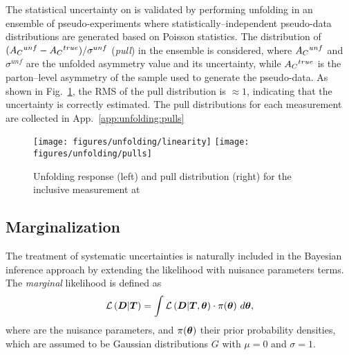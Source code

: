 The statistical uncertainty on \ac{} is validated by performing unfolding in
an ensemble of pseudo-experiments where statistically--independent
pseudo-data distributions are generated based on Poisson statistics.  
The distribution of $(A_C{}^{unf}-A_C{}^{true})/\sigma^{unf}$
({\it pull}) in the ensemble is considered, where $A_C{}^{unf}$ and
$\sigma^{unf}$ are the unfolded asymmetry value and its uncertainty,
while $A_C{}^{true}$ is the parton--level asymmetry of the sample used
to generate the pseudo-data. As shown in Fig.~\ref{fig:pulllinearity}, the
RMS of the pull distribution is $\approx{}1$, indicating that the
uncertainty is correctly estimated. The pull distributions for each
measurement are collected in App.~\ref{app:unfolding:pulls}

\begin{figure}[!htb]\centering
  \texttt{[image: figures/unfolding/linearity]}
  \texttt{[image: figures/unfolding/pulls]}
  \caption{Unfolding response (left) and pull distribution (right) for the
    inclusive \ac{} measurement at \eighttev{}}
  \label{fig:pulllinearity}
\end{figure}

\subsection{Marginalization}
\label{sec:marginalization}

The treatment of systematic uncertainties is naturally included in the
Bayesian inference approach by extending the likelihood
\conditionalLhood{\Data{}}{\Truth{}} with nuisance parameters terms.
The {\it marginal} likelihood is defined as
\begin{equation}
  \mathcal{L}\left(\boldsymbol{D}{}|\boldsymbol{T}{}\right)=
  \int
  \mathcal{L}\left(\boldsymbol{D}{}|\boldsymbol{T}{},\boldsymbol{\theta}{}\right) 
  \cdot{} \pi{}(\boldsymbol{\theta}{})
  ~d\boldsymbol{\theta}{},
\end{equation}
where \thetavec{} are the nuisance parameters, and
$\pi{}(\boldsymbol{\theta}{})$ their prior probability densities, which are
assumed to be Gaussian distributions $G$ with $\mu=0$ and $\sigma=1$.

